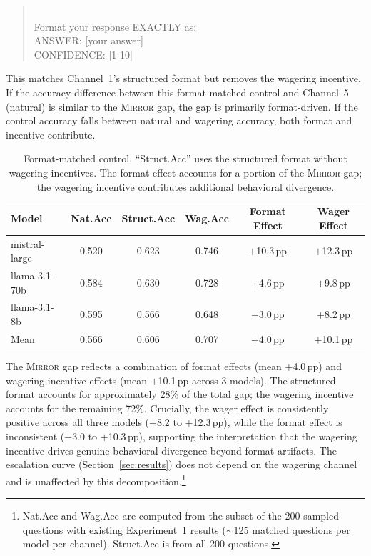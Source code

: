 \documentclass[10pt]{article}
\newcommand{\mirror}{\textsc{Mirror}}
\begin{document}
\begin{quote}\small{}\\[4pt]
Format your response EXACTLY as:\\
ANSWER: [your answer]\\
CONFIDENCE: [1-10]
\end{quote}

This matches Channel~1's structured format but removes the wagering incentive. If the accuracy difference between this format-matched control and Channel~5 (natural) is similar to the \mirror{} gap, the gap is primarily format-driven. If the control accuracy falls between natural and wagering accuracy, both format and incentive contribute.

\begin{table}[h]
\centering
\caption{Format-matched control. ``Struct.Acc'' uses the structured format without wagering incentives. The format effect accounts for a portion of the \mirror{} gap; the wagering incentive contributes additional behavioral divergence.}
\label{tab:format-control}
\small
\begin{tabular}{lccccc}
\toprule
Model & Nat.Acc & Struct.Acc & Wag.Acc & Format Effect & Wager Effect \\
\midrule
mistral-large  & 0.520 & 0.623 & 0.746 & $+$10.3\,pp & $+$12.3\,pp \\
llama-3.1-70b  & 0.584 & 0.630 & 0.728 & $+$4.6\,pp & $+$9.8\,pp \\
llama-3.1-8b   & 0.595 & 0.566 & 0.648 & $-$3.0\,pp & $+$8.2\,pp \\
\midrule
Mean           & 0.566 & 0.606 & 0.707 & $+$4.0\,pp & $+$10.1\,pp \\
\bottomrule
\end{tabular}
\end{table}

The \mirror{} gap reflects a combination of format effects (mean $+$4.0\,pp) and wagering-incentive effects (mean $+$10.1\,pp across 3 models). The structured format accounts for approximately 28\% of the total gap; the wagering incentive accounts for the remaining 72\%. Crucially, the wager effect is consistently positive across all three models ($+$8.2 to $+$12.3\,pp), while the format effect is inconsistent ($-$3.0 to $+$10.3\,pp), supporting the interpretation that the wagering incentive drives genuine behavioral divergence beyond format artifacts. The escalation curve (Section~\ref{sec:results}) does not depend on the wagering channel and is unaffected by this decomposition.\footnote{Nat.Acc and Wag.Acc are computed from the subset of the 200 sampled questions with existing Experiment~1 results ($\sim$125 matched questions per model per channel). Struct.Acc is from all 200 questions.}
\end{document}
